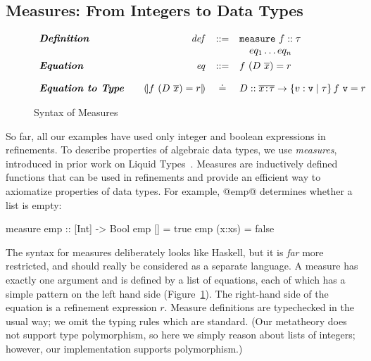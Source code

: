 \newcommand\hnull{\ensuremath{\text{[]}}\xspace}

\subsection{Measures: From Integers to Data Types}\label{sec:measures}

\begin{figure}
\centering
\captionsetup{justification=centering}
$$
\begin{array}{lrcl}
{\emphbf{Definition}} &
  \mathit{def} & ::=  &  \mathtt{measure} \ f :: \tau \\
              & &      &  \quad eq_1 \ldots eq_n       \\[0.05in]

{\emphbf{Equation}}   & 
  \mathit{eq}  & ::=  &   f\ (D\ \overline{x}) = r    \\[0.15in] 

{\emphbf{Equation to Type}} &
\quad \embed{f\ (D\ \overline{x}) = r} & \defeq & D :: \overline{\tbind{x}{\tau}} \rightarrow \tref{\mathtt{v}}{\tau}{}{f\ \mathtt{v} = r}
\end{array}
$$
\caption{Syntax of Measures}
\label{fig:measures}
\end{figure}



So far, all our examples have used only integer and boolean expressions in refinements.
To describe properties of algebraic data types, we use \emph{measures},
introduced in prior work on Liquid Types~\cite{LiquidPLDI09}.
%
Measures are inductively defined functions that can be used in refinements and
provide an efficient way to axiomatize properties of data types.
%
For example, @emp@ determines whether a list is empty:
%
\begin{code}
  measure emp  :: [Int] -> Bool
    emp []     = true
    emp (x:xs) = false
\end{code}
The syntax for measures deliberately looks like Haskell, but it is \emph{far} more
restricted, and should really be considered as a separate language.
A measure has exactly one argument and is defined by a list of equations,
each of which has a simple pattern on the left hand side (Figure~\ref{fig:measures}).
The right-hand side of the equation is a refinement expression $r$.
Measure definitions are typechecked in the usual way; we omit the typing rules which are standard.
(Our metatheory does not support type polymorphism,
so here we simply reason about lists of integers;
however, our implementation supports polymorphism.)

